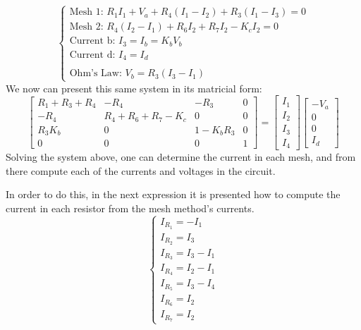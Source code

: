 $$
\begin{cases}
  \text{Mesh 1: } R_{1}I_{1}+V_{a}+R_{4}(I_{1}-I_{2})+R_{3}(I_{1}-I_{3}) = 0\\
  \text{Mesh 2: } R_{4}(I_{2}-I_{1})+R_{6}I_{2}+R_{7}I_{2}-K_{c}I_{2} = 0\\
  \text{Current b: } I_{3} = I_{b} = K_{b}V_{b}\\
  \text{Current d: } I_{4} = I_{d}\\
  \\
  \text{Ohm's Law: } V_{b} = R_{3}(I_{3}-I_{1})
\end{cases}
$$
We now can present this same system in its matricial form:
$$
\begin{bmatrix}
  R_{1}+R_{3}+R_{4} & -R_{4} & -R_{3} & 0 \\
  -R_{4} & R_{4}+R_{6}+R_{7}-K_{c} & 0 & 0\\
  R_{3}K_{b} & 0 & 1-K_{b}R_{3} & 0\\
  0 & 0 & 0 & 1
\end{bmatrix}
=
\begin{bmatrix}
  I_{1}\\
  I_{2}\\
  I_{3}\\
  I_{4}
\end{bmatrix}
\begin{bmatrix}
  -V_{a}\\
  0\\
  0\\
  I_{d}
\end{bmatrix}
$$
Solving the system above, one can determine the current in each mesh, and from there compute each of the currents and voltages in the circuit.\par
In order to do this, in the next expression it is presented how to compute the current in each
resistor from the mesh method's currents.
$$
\begin{cases}
	I_{R_{1}} = -I_{1}\\
	I_{R_{2}} = I_{3}\\
	I_{R_{3}} = I_{3}-I_{1}\\
	I_{R_{4}} = I_{2}-I_{1}\\
	I_{R_{5}} = I_{3}-I_{4}\\
	I_{R_{6}} = I_{2}\\
	I_{R_{7}} = I_{2}
\end{cases}
$$

